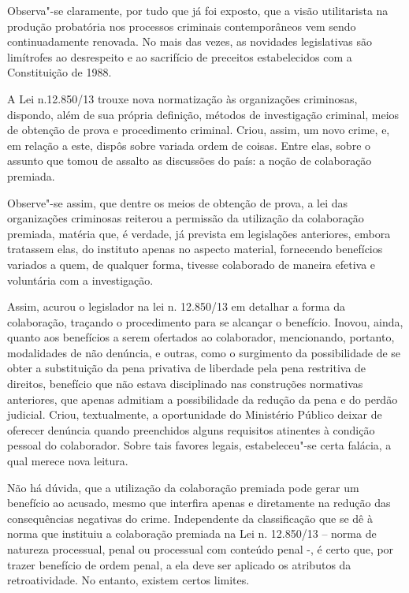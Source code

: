 Observa"-se claramente, por tudo que já foi exposto, que a visão
utilitarista na produção probatória nos processos criminais
contemporâneos vem sendo continuadamente renovada. No mais das vezes, as
novidades legislativas são limítrofes ao desrespeito e ao sacrifício de
preceitos estabelecidos com a Constituição de 1988.

A Lei n.12.850/13 trouxe nova normatização às organizações criminosas,
dispondo, além de sua própria definição, métodos de investigação
criminal, meios de obtenção de prova e procedimento criminal. Criou,
assim, um novo crime, e, em relação a este, dispôs sobre variada ordem
de coisas. Entre elas, sobre o assunto que tomou de assalto as
discussões do país: a noção de colaboração premiada.

Observe"-se assim, que dentre os meios de obtenção de prova, a lei das
organizações criminosas reiterou a permissão da utilização da
colaboração premiada, matéria que, é verdade, já prevista em legislações
anteriores, embora tratassem elas, do instituto apenas no aspecto
material, fornecendo benefícios variados a quem, de qualquer forma,
tivesse colaborado de maneira efetiva e voluntária com a investigação.

Assim, acurou o legislador na lei n. 12.850/13 em detalhar a forma da
colaboração, traçando o procedimento para se alcançar o benefício.
Inovou, ainda, quanto aos benefícios a serem ofertados ao colaborador,
mencionando, portanto, modalidades de não denúncia, e outras, como o
surgimento da possibilidade de se obter a substituição da pena privativa
de liberdade pela pena restritiva de direitos, benefício que não estava
disciplinado nas construções normativas anteriores, que apenas admitiam
a possibilidade da redução da pena e do perdão judicial. Criou,
textualmente, a oportunidade do Ministério Público deixar de oferecer
denúncia quando preenchidos alguns requisitos atinentes à condição
pessoal do colaborador. Sobre tais favores legais, estabeleceu"-se certa
falácia, a qual merece nova leitura.

Não há dúvida, que a utilização da colaboração premiada pode gerar um
benefício ao acusado, mesmo que interfira apenas e diretamente na
redução das consequências negativas do crime. Independente da
classificação que se dê à norma que instituiu a colaboração premiada na
Lei n. 12.850/13 -- norma de natureza processual, penal ou processual
com conteúdo penal -, é certo que, por trazer benefício de ordem penal,
a ela deve ser aplicado os atributos da retroatividade. No entanto,
existem certos limites.


